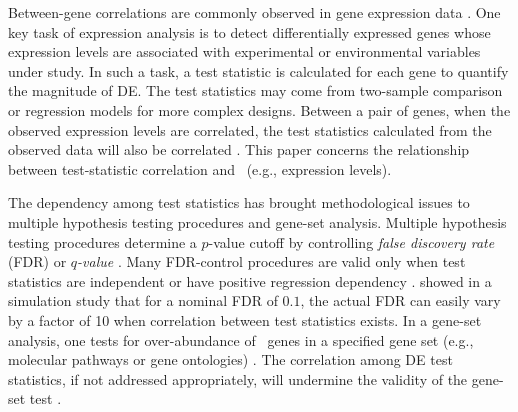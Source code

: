 Between-gene correlations are commonly observed in gene expression 
data \citep{efron2012large1, gatti2010heading, 
	huang2013gene,qiu2005effects,storey2003positive}.
One key task of expression analysis is to detect differentially expressed genes whose 
expression levels are associated with experimental or environmental variables under study. 
In such a task, a test statistic is calculated for each gene to quantify the magnitude of DE. 
The test statistics may come from two-sample comparison or regression models for more complex 
designs. Between a pair of genes, when the observed expression levels are correlated, the test 
statistics calculated from the observed data will also be correlated 
\citep{barry2008statistical, efron2007correlation, wu2012camera}. This paper concerns the 
relationship between test-statistic correlation and \popucor~(e.g., expression levels).

The dependency among test statistics has brought methodological issues to multiple hypothesis 
testing procedures and gene-set analysis. 
Multiple hypothesis testing procedures determine a $p$-value cutoff by controlling 
\textit{false discovery rate} (FDR) 
\citep{benjamini1995controlling} or 
\textit{$q$-value} \citep{storey2003positive}. 
Many FDR-control procedures are valid only 
when test statistics are independent \citep{benjamini1995controlling} or 
have positive regression dependency \citep{benjamini2001control}. 
\citet{efron2007correlation} showed in a simulation study that for a nominal FDR of 
$0.1$, the actual FDR can easily vary by a factor of 10 when correlation between test 
statistics exists. 
In a gene-set analysis, one tests for over-abundance of \DED~genes in a
specified gene set (e.g., molecular pathways or gene ontologies) \citep{goeman2007analyzing}. 
The correlation among DE test statistics, if not addressed appropriately, will undermine 
the validity of the gene-set test \citep{gatti2010heading, wu2012camera}. 

